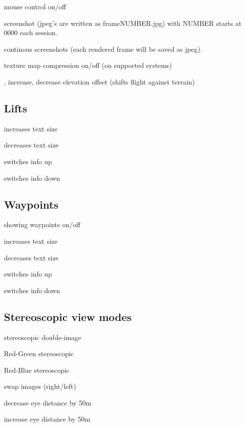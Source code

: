 \begin{hkkeys}
\item[\keys{m}]        mouse control on/off
\item[\keys{p}]        screenshot (jpeg's are written as frameNUMBER.jpg)
        with NUMBER starts at 0000 each session.

\item[\keys{P}]        continous screenshots
        (each rendered frame will be saved as jpeg).

\item[\keys{y}]        texture map compression on/off (on supported systems)

\item[\keys{u}, \keys{i}]      increase, decrease elevation offset
        (shifts flight against terrain)
\end{hkkeys}


\subsection*{Lifts}
\begin{hkkeys}
\item[\keys{\shift+page-up}] increases text size
\item[\keys{\shift+page-down}] decreases text size
\item[\keys{Pos1}] switches info up
\item[\keys{End}] switches info down
\end{hkkeys}

\subsection*{Waypoints}
\begin{hkkeys}
\item[\keys{F12}] showing waypoints on/off
\item[\keys{\shift+page-up}] increases text size
\item[\keys{\shift+page-down}] decreases text size
\item[\keys{\shift+Pos1}] switches info up
\item[\keys{\shift+End}] switches info down
\end{hkkeys}


\subsection*{Stereoscopic view modes}

\begin{hkkeys}
\item[\keys{S}]        stereoscopic double-image
\item[\keys{D}]        Red-Green stereoscopic
\item[\keys{F}]        Red-Blue stereoscopic
\item[\keys{A}]        swap images (right/left)
\item[\keys{Q}]        decrease eye distance by 50m
\item[\keys{W}]        increase eye distance by 50m
\end{hkkeys}



